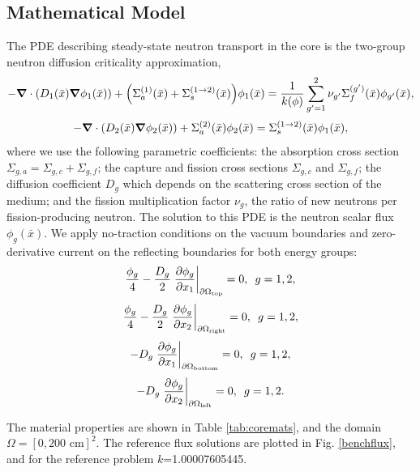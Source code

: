 \documentclass{mc2015}
\newcommand{\xs}[2]{\ensuremath{\Sigma_{#1}^{(#2)}}}
\begin{document}
\subsection{Mathematical Model}
The PDE describing steady-state neutron transport in the core is the two-group neutron diffusion criticality approximation,
\begin{equation}
-\grad\cdot\qty( D_1(\bar x)\grad\phi_1(\bar x))+\qty(\xs{a}{1}(\bar x)+\xs{s}{1\to2}(\bar x))\phi_1(\bar x) = \frac{1}{k(\phi)}\sum_{g'=1}^2\nu_{g'}\xs{f}{g'}(\bar x)\phi_{g'}(\bar x),
\end{equation}
\begin{equation}
-\grad \cdot\qty(D_2(\bar x)\grad \phi_2(\bar x))+\xs{a}{2}(\bar x)\phi_2(\bar x) = \xs{s}{1\to 2}(\bar x)\phi_1(\bar x),
\end{equation}
where we use the following parametric coefficients: the absorption cross section $\Sigma_{g,a}=\Sigma_{g,c}+\Sigma_{g,f}$; the capture and fission cross sections $\Sigma_{g,c}$ and $\Sigma_{g,f}$; the diffusion coefficient $D_g$ which depends on the scattering cross section of the medium; and the fission multiplication factor $\nu_g$, the ratio of new neutrons per fission-producing neutron.  The solution to this PDE is the neutron scalar flux $\phi_g(\bar x)$.  We apply no-traction conditions on the vacuum boundaries and zero-derivative current on the reflecting boundaries for both energy groups:
 \begin{equation}
\frac{\phi_g}{4}-\frac{D_g}{2}\eval{\pdv{\phi_g}{x_1}}_{\partial \Omega_\text{top}}=0,\hspace{5pt} g=1,2,
\end{equation}
\begin{equation}
\frac{\phi_g}{4}-\frac{D_g}{2}\eval{\pdv{\phi_g}{x_2}}_{\partial \Omega_\text{right}}=0,\hspace{5pt} g=1,2,
\end{equation}
\begin{equation}
-D_g\eval{\pdv{\phi_g}{x_1}}_{\partial \Omega_\text{bottom}}=0,\hspace{5pt} g=1,2,
\end{equation}
\begin{equation}
-D_g\eval{\pdv{\phi_g}{x_2}}_{\partial \Omega_\text{left}}=0,\hspace{5pt} g=1,2.
\end{equation}

The material properties are shown in Table \ref{tab:coremats}, and the domain $\Omega=[0,200\text{ cm}]^2$.  The reference flux solutions are plotted in Fig. \ref{benchflux}, and for the reference problem $k$=1.00007605445.
\end{document}
